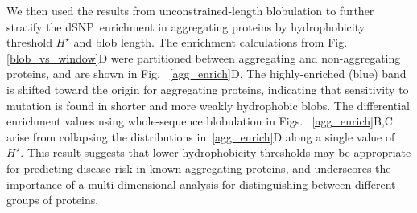 \documentclass[9pt,twocolumn,twoside,lineno]{pnas-new}
\newcommand{\inserted}[1]{{#1}}
\newcommand{\dSNP}{dSNP~}
\newcommand{\Ht}{H^{\star}}
\begin{document}
We then used the results from unconstrained-length blobulation to further stratify the \dSNP enrichment in aggregating proteins by hydrophobicity threshold $\Ht$ and blob length. The enrichment calculations from Fig. \ref{blob_vs_window}D were partitioned between aggregating and non-aggregating proteins, and are shown in Fig. ~\ref{agg_enrich}D. The highly-enriched (blue) band is shifted toward the origin for aggregating proteins, indicating that sensitivity to mutation is found in shorter and more weakly hydrophobic blobs. \inserted{The differential enrichment values using whole-sequence blobulation in Figs. ~\ref{agg_enrich}B,C arise from collapsing the distributions in~\ref{agg_enrich}D along a single value of $\Ht$. This result suggests that lower hydrophobicity thresholds may be appropriate for predicting disease-risk in known-aggregating proteins, and underscores the importance of a multi-dimensional analysis for distinguishing between different groups of proteins.} 
\end{document}
